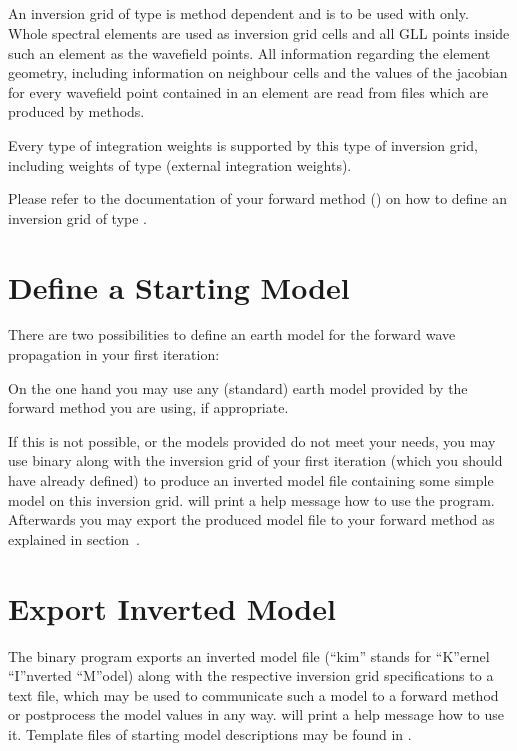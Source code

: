 \subsection{} \label{basic_steps,sec:invgrid,sub:specfem3d}
%
An inversion grid of type  is method dependent and is to be used with 
 only. Whole spectral elements are used as inversion grid cells and all 
GLL points inside such an element as the wavefield points. All information regarding the element 
geometry, including information on neighbour cells and the values of the jacobian for every wavefield 
point contained in an element are read from files which are produced by  methods.

Every type of integration weights is supported by this type of inversion grid, including weights of type 
 (external integration weights).

Please refer to the documentation of your  forward method ()
on how to define an inversion grid of type .
%
\section{Define a Starting Model} \label{basic_steps,sec:start_model}
%
There are two possibilities to define an earth model for the forward wave propagation in your first iteration:

On the one hand you may use any (standard) earth model provided by the forward method you are using, if appropriate.

If this is not possible, or the models provided do not meet your needs, you may use binary 
 along with the inversion grid of your first iteration (which you should 
have already defined) to produce an inverted model file containing some simple model on this inversion grid. 
 will print a help message how to use the program. Afterwards you may 
export the produced model file to your forward method as explained in section~.
%
\section{Export Inverted Model} \label{basic_steps,sec:export_kim}
%
The binary program  exports an inverted model file (``kim'' stands for ``K''ernel 
``I''nverted ``M''odel) along with the respective inversion grid specifications to a text file, 
which may be used to communicate such a model to a forward method or postprocess the model values in any way. 
 will print a help message how to use it. Template files of starting model descriptions
may be found in .
%
